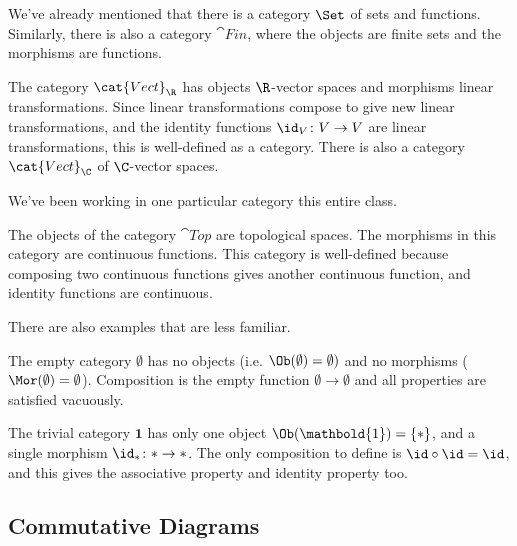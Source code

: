 \documentclass[noname]{notes}
\begin{document}
\begin{example}
	We've already mentioned that there is a category $\Set$ of sets and functions. Similarly, there is also a category $\cat{Fin}$, where the objects are finite sets and the morphisms are functions. 
\end{example}

\begin{example}
	The category $\cat{Vect}_\R$ has objects $\R$-vector spaces and morphisms linear transformations. Since linear transformations compose to give new linear transformations, and the identity functions $\id_V \colon V \to V$ are linear transformations, this is well-defined as a category. There is also a category $\cat{Vect}_{\C}$ of $\C$-vector spaces. 
\end{example}

We've been working in one particular category this entire class. 

\begin{example}
	The objects of the category $\cat{Top}$ are topological spaces. The morphisms in this category are continuous functions. This category is well-defined because composing two continuous functions gives another continuous function, and identity functions are continuous. 
\end{example}

There are also examples that are less familiar. 

\begin{example}
	The empty category $\emptyset$ has no objects (i.e. $\Ob(\emptyset) = \emptyset)$ and no morphisms ($\Mor(\emptyset) = \emptyset$). Composition is the empty function $\emptyset \to \emptyset$ and all properties are satisfied vacuously. 
\end{example}

\begin{example}
	The trivial category $\mathbold{1}$ has only one object $\Ob(\mathbold{1}) = \{\ast\}$, and a single morphism $\id_\ast \colon \ast \to \ast$. The only composition to define is $\id \circ \id = \id$, and this gives the associative property and identity property too. 
\end{example}


\subsection{Commutative Diagrams}
\end{document}
